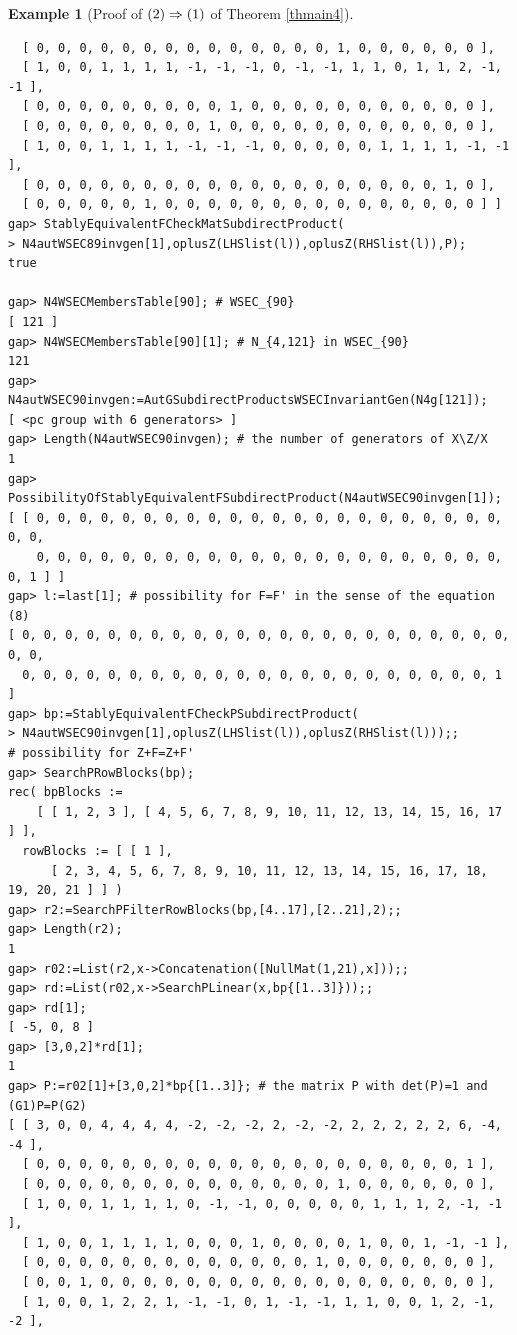 \documentclass{amsart}
\theoremstyle{plain}
\theoremstyle{definition}
\newtheorem{example}[theorem]{Example}
\theoremstyle{remark}
\begin{document}
\begin{example}[Proof of ${\rm (2)}\Rightarrow {\rm (1)}$ of {Theorem \ref{thmain4}}]
\begin{verbatim}
  [ 0, 0, 0, 0, 0, 0, 0, 0, 0, 0, 0, 0, 0, 0, 1, 0, 0, 0, 0, 0, 0 ], 
  [ 1, 0, 0, 1, 1, 1, 1, -1, -1, -1, 0, -1, -1, 1, 1, 0, 1, 1, 2, -1, -1 ], 
  [ 0, 0, 0, 0, 0, 0, 0, 0, 0, 1, 0, 0, 0, 0, 0, 0, 0, 0, 0, 0, 0 ], 
  [ 0, 0, 0, 0, 0, 0, 0, 0, 1, 0, 0, 0, 0, 0, 0, 0, 0, 0, 0, 0, 0 ], 
  [ 1, 0, 0, 1, 1, 1, 1, -1, -1, -1, 0, 0, 0, 0, 0, 1, 1, 1, 1, -1, -1 ], 
  [ 0, 0, 0, 0, 0, 0, 0, 0, 0, 0, 0, 0, 0, 0, 0, 0, 0, 0, 0, 1, 0 ], 
  [ 0, 0, 0, 0, 0, 1, 0, 0, 0, 0, 0, 0, 0, 0, 0, 0, 0, 0, 0, 0, 0 ] ]
gap> StablyEquivalentFCheckMatSubdirectProduct(
> N4autWSEC89invgen[1],oplusZ(LHSlist(l)),oplusZ(RHSlist(l)),P);
true

gap> N4WSECMembersTable[90]; # WSEC_{90}
[ 121 ]
gap> N4WSECMembersTable[90][1]; # N_{4,121} in WSEC_{90}
121
gap> N4autWSEC90invgen:=AutGSubdirectProductsWSECInvariantGen(N4g[121]);
[ <pc group with 6 generators> ]
gap> Length(N4autWSEC90invgen); # the number of generators of X\Z/X
1
gap> PossibilityOfStablyEquivalentFSubdirectProduct(N4autWSEC90invgen[1]);
[ [ 0, 0, 0, 0, 0, 0, 0, 0, 0, 0, 0, 0, 0, 0, 0, 0, 0, 0, 0, 0, 0, 0, 0, 0, 
    0, 0, 0, 0, 0, 0, 0, 0, 0, 0, 0, 0, 0, 0, 0, 0, 0, 0, 0, 0, 0, 0, 0, 1 ] ]
gap> l:=last[1]; # possibility for F=F' in the sense of the equation (8)
[ 0, 0, 0, 0, 0, 0, 0, 0, 0, 0, 0, 0, 0, 0, 0, 0, 0, 0, 0, 0, 0, 0, 0, 0, 0, 
  0, 0, 0, 0, 0, 0, 0, 0, 0, 0, 0, 0, 0, 0, 0, 0, 0, 0, 0, 0, 0, 0, 1 ]
gap> bp:=StablyEquivalentFCheckPSubdirectProduct(
> N4autWSEC90invgen[1],oplusZ(LHSlist(l)),oplusZ(RHSlist(l)));;
# possibility for Z+F=Z+F'
gap> SearchPRowBlocks(bp);
rec( bpBlocks := 
    [ [ 1, 2, 3 ], [ 4, 5, 6, 7, 8, 9, 10, 11, 12, 13, 14, 15, 16, 17 ] ], 
  rowBlocks := [ [ 1 ], 
      [ 2, 3, 4, 5, 6, 7, 8, 9, 10, 11, 12, 13, 14, 15, 16, 17, 18, 19, 20, 21 ] ] )
gap> r2:=SearchPFilterRowBlocks(bp,[4..17],[2..21],2);;
gap> Length(r2);
1
gap> r02:=List(r2,x->Concatenation([NullMat(1,21),x]));;
gap> rd:=List(r02,x->SearchPLinear(x,bp{[1..3]}));;
gap> rd[1];
[ -5, 0, 8 ]
gap> [3,0,2]*rd[1];
1
gap> P:=r02[1]+[3,0,2]*bp{[1..3]}; # the matrix P with det(P)=1 and (G1)P=P(G2)
[ [ 3, 0, 0, 4, 4, 4, 4, -2, -2, -2, 2, -2, -2, 2, 2, 2, 2, 2, 6, -4, -4 ], 
  [ 0, 0, 0, 0, 0, 0, 0, 0, 0, 0, 0, 0, 0, 0, 0, 0, 0, 0, 0, 0, 1 ], 
  [ 0, 0, 0, 0, 0, 0, 0, 0, 0, 0, 0, 0, 0, 0, 1, 0, 0, 0, 0, 0, 0 ], 
  [ 1, 0, 0, 1, 1, 1, 1, 0, -1, -1, 0, 0, 0, 0, 0, 1, 1, 1, 2, -1, -1 ], 
  [ 1, 0, 0, 1, 1, 1, 1, 0, 0, 0, 1, 0, 0, 0, 0, 1, 0, 0, 1, -1, -1 ], 
  [ 0, 0, 0, 0, 0, 0, 0, 0, 0, 0, 0, 0, 0, 1, 0, 0, 0, 0, 0, 0, 0 ], 
  [ 0, 0, 1, 0, 0, 0, 0, 0, 0, 0, 0, 0, 0, 0, 0, 0, 0, 0, 0, 0, 0 ], 
  [ 1, 0, 0, 1, 2, 2, 1, -1, -1, 0, 1, -1, -1, 1, 1, 0, 0, 1, 2, -1, -2 ], 

\end{verbatim}
\end{example}
\end{document}
